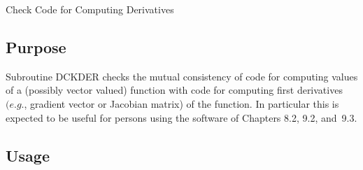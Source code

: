 \documentclass[twoside]{MATH77}
\begin{document}
 Check Code for Computing Derivatives


\subsection{Purpose}

Subroutine DCKDER checks the mutual consistency of code for computing values
of a (possibly vector valued) function with code for computing first
derivatives $(e.g.$, gradient vector or Jacobian matrix) of the function. In
particular this is expected to be useful for persons using the software of
Chapters 8.2, 9.2, and~9.3.

\subsection{Usage}
\end{document}
